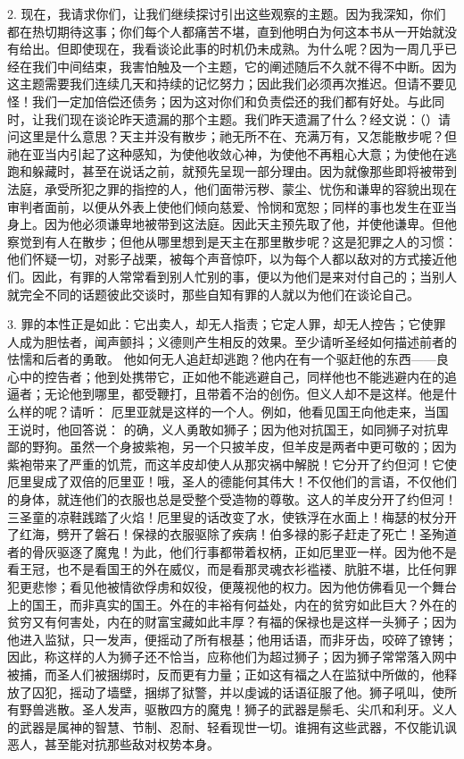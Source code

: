 2. 现在，我请求你们，让我们继续探讨引出这些观察的主题。因为我深知，你们都在热切期待这事；你们每个人都痛苦不堪，直到他明白为何这本书从一开始就没有给出。但即使现在，我看谈论此事的时机仍未成熟。为什么呢？因为一周几乎已经在我们中间结束，我害怕触及一个主题，它的阐述随后不久就不得不中断。因为这主题需要我们连续几天和持续的记忆努力；因此我们必须再次推迟。但请不要见怪！我们一定加倍偿还债务；因为这对你们和负责偿还的我们都有好处。与此同时，让我们现在谈论昨天遗漏的那个主题。我们昨天遗漏了什么？经文说：（）请问这里是什么意思？天主并没有散步；祂无所不在、充满万有，又怎能散步呢？但祂在亚当内引起了这种感知，为使他收敛心神，为使他不再粗心大意；为使他在逃跑和躲藏时，甚至在说话之前，就预先呈现一部分理由。因为就像那些即将被带到法庭，承受所犯之罪的指控的人，他们面带污秽、蒙尘、忧伤和谦卑的容貌出现在审判者面前，以便从外表上使他们倾向慈爱、怜悯和宽恕；同样的事也发生在亚当身上。因为他必须谦卑地被带到这法庭。因此天主预先取了他，并使他谦卑。但他察觉到有人在散步；但他从哪里想到是天主在那里散步呢？这是犯罪之人的习惯：他们怀疑一切，对影子战栗，被每个声音惊吓，以为每个人都以敌对的方式接近他们。因此，有罪的人常常看到别人忙别的事，便以为他们是来对付自己的；当别人就完全不同的话题彼此交谈时，那些自知有罪的人就以为他们在谈论自己。\par

3. 罪的本性正是如此：它出卖人，却无人指责；它定人罪，却无人控告；它使罪人成为胆怯者，闻声颤抖；义德则产生相反的效果。至少请听圣经如何描述前者的怯懦和后者的勇敢。 他如何无人追赶却逃跑？他内在有一个驱赶他的东西——良心中的控告者；他到处携带它，正如他不能逃避自己，同样他也不能逃避内在的追逼者；无论他到哪里，都受鞭打，且带着不治的创伤。但义人却不是这样。他是什么样的呢？请听： 厄里亚就是这样的一个人。例如，他看见国王向他走来，当国王说时，他回答说： 的确，义人勇敢如狮子；因为他对抗国王，如同狮子对抗卑鄙的野狗。虽然一个身披紫袍，另一个只披羊皮，但羊皮是两者中更可敬的；因为紫袍带来了严重的饥荒，而这羊皮却使人从那灾祸中解脱！它分开了约但河！它使厄里叟成了双倍的厄里亚！哦，圣人的德能何其伟大！不仅他们的言语，不仅他们的身体，就连他们的衣服也总是受整个受造物的尊敬。这人的羊皮分开了约但河！三圣童的凉鞋践踏了火焰！厄里叟的话改变了水，使铁浮在水面上！梅瑟的杖分开了红海，劈开了磐石！保禄的衣服驱除了疾病！伯多禄的影子赶走了死亡！圣殉道者的骨灰驱逐了魔鬼！为此，他们行事都带着权柄，正如厄里亚一样。因为他不是看王冠，也不是看国王的外在威仪，而是看那灵魂衣衫褴褛、肮脏不堪，比任何罪犯更悲惨；看见他被情欲俘虏和奴役，便蔑视他的权力。因为他仿佛看见一个舞台上的国王，而非真实的国王。外在的丰裕有何益处，内在的贫穷如此巨大？外在的贫穷又有何害处，内在的财富宝藏如此丰厚？有福的保禄也是这样一头狮子；因为他进入监狱，只一发声，便摇动了所有根基；他用话语，而非牙齿，咬碎了镣铐；因此，称这样的人为狮子还不恰当，应称他们为超过狮子；因为狮子常常落入网中被捕，而圣人们被捆绑时，反而更有力量；正如这有福之人在监狱中所做的，他释放了囚犯，摇动了墙壁，捆绑了狱警，并以虔诚的话语征服了他。狮子吼叫，使所有野兽逃散。圣人发声，驱散四方的魔鬼！狮子的武器是鬃毛、尖爪和利牙。义人的武器是属神的智慧、节制、忍耐、轻看现世一切。谁拥有这些武器，不仅能讥讽恶人，甚至能对抗那些敌对权势本身。\par

